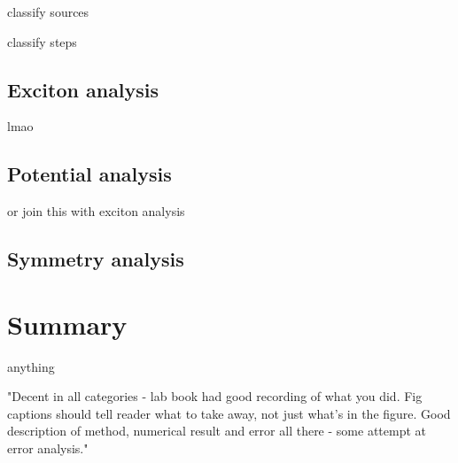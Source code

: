 \documentclass[journal]{Imperial_lab_report}
\begin{document}
classify sources

classify steps

\subsection{Exciton analysis}
lmao

\subsection{Potential analysis}
or join this with exciton analysis

\subsection{Symmetry analysis}

\section{Summary}
anything





\ifCLASSOPTIONcaptionsoff
  \newpage
\fi

"Decent in all categories - lab book had good recording of what you did. Fig captions should tell reader what to take away, not just what's in the figure. Good description of method, numerical result and error all there - some attempt at error analysis."



%
%
%
 
%





\end{document}
